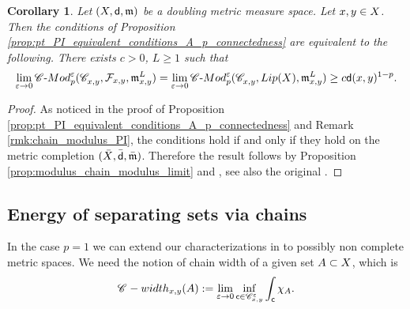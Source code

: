 \documentclass[12pt]{amsart}
\newcommand{\sfd}{{\sf d}}
\newcommand{\X}{{\rm X}}
\newcommand{\Lip}{{\rm Lip}}
\newcommand{\mm}{\mathfrak m}
\newcommand{\width}{{\rm width}}
\renewcommand{\SS}{{\rm SS}}
\newtheorem{corollary}[theorem]{Corollary}
\theoremstyle{definition}
\newtheorem{definition}[theorem]{Definition}
\newcommand{\cModepsilon}[2]{{\mathscr C}\text{-}{\rm Mod}_{#2}^{#1}}
\newcommand{\sfc}{{\sf c}}
\newcommand{\Chain}[1]{\mathscr{C}^{#1}}
\begin{document}
%
\begin{corollary}
    Let $(\X,\sfd,\mm)$ be a doubling metric measure space. Let $x,y\in \X$. Then the conditions of Proposition \ref{prop:pt_PI_equivalent_conditions_A_p_connectedness} are equivalent to the following. There exists $c>0$, $L\ge 1$ such that
    $$\lim_{\varepsilon \to 0} \cModepsilon{\varepsilon}{p}(\Chain{}_{x,y}, \mathcal{F}_{x,y} ,\mm_{x,y}^L) = \lim_{\varepsilon \to 0} \cModepsilon{\varepsilon}{p}(\Chain{}_{x,y}, \Lip(\X), \mm_{x,y}^L) \ge c\sfd(x,y)^{1-p}.$$
\end{corollary}
%
\begin{proof}
    As noticed in the proof of Proposition \ref{prop:pt_PI_equivalent_conditions_A_p_connectedness} and Remark \ref{rmk:chain_modulus_PI}, the conditions hold if and only if they hold on the metric completion $(\bar{X},\bar{\sfd},\bar{\mm})$. Therefore the result follows by Proposition \ref{prop:modulus_chain_modulus_limit} and \cite[Proposition A.1]{CaputoCavallucci2024II}, see also the original \cite[Theorem 2]{Kei03}.
\end{proof}
%
\subsection{Energy of separating sets via chains}
%
\label{sec:separating_sets_chains}
%
In the case $p=1$ we can extend our characterizations in \cite{CaputoCavallucci2024II} to possibly non complete metric spaces.
%
We need the notion of chain width of a given set $A \subset \X$, which is
\begin{equation}
    \Chain{}\textup{-}\width_{x,y}(A):= \lim_{\varepsilon \to 0}\inf_{\sfc \in \Chain{\varepsilon}_{x,y}} \int_{\sfc} \chi_A.
\end{equation}
%

%
\end{document}
